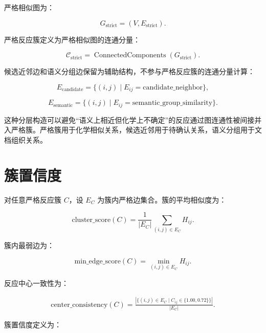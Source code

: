 \documentclass[11pt]{article}
\numberwithin{equation}{section}
\DeclareMathOperator{\ConnectedComponents}{ConnectedComponents}
\begin{document}
严格相似图为：

\begin{equation}
G_{\mathrm{strict}}
=
(V,E_{\mathrm{strict}}).
\end{equation}

严格反应簇定义为严格相似图的连通分量：

\begin{equation}
\mathcal C_{\mathrm{strict}}
=
\ConnectedComponents(G_{\mathrm{strict}}).
\end{equation}

候选近邻边和语义分组边保留为辅助结构，不参与严格反应簇的连通分量计算：

\begin{equation}
E_{\mathrm{candidate}}
=
\{(i,j)\mid E_{ij}=\mathrm{candidate\_neighbor}\},
\end{equation}

\begin{equation}
E_{\mathrm{semantic}}
=
\{(i,j)\mid E_{ij}=\mathrm{semantic\_group\_similarity}\}.
\end{equation}

这种分层构造可以避免“语义上相近但化学上不确定”的反应通过图连通性被间接并入严格簇。严格簇用于化学相似关系，候选近邻用于待确认关系，语义分组用于文档组织关系。

\section{簇置信度}

对任意严格反应簇 \(C\)，设 \(E_C\) 为簇内严格边集合。簇的平均相似度为：

\begin{equation}
\mathrm{cluster\_score}(C)
=
\frac{1}{|E_C|}
\sum_{(i,j)\in E_C} H_{ij}.
\end{equation}

簇内最弱边为：

\begin{equation}
\mathrm{min\_edge\_score}(C)
=
\min_{(i,j)\in E_C} H_{ij}.
\end{equation}

反应中心一致性为：

\begin{equation}
\begin{aligned}
\mathrm{center\_consistency}(C)
=
\frac{
|\{(i,j)\in E_C \mid C_{ij}\in\{1.00,0.72\}\}|
}{
|E_C|
}.
\end{aligned}
\end{equation}

簇置信度定义为：
\end{document}

